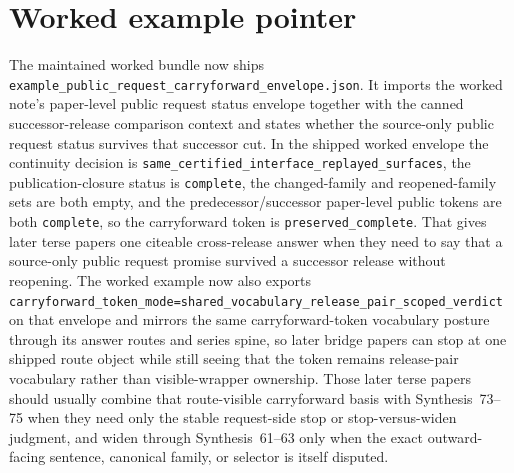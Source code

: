 \documentclass[11pt]{article}
\begin{document}
\section{Worked example pointer}
The maintained worked bundle now ships \nolinkurl{example_public_request_carryforward_envelope.json}.\cite{series:workedexample}
It imports the worked note's paper-level public request status envelope together with the canned successor-release comparison context and states whether the source-only public request status survives that successor cut. In the shipped worked envelope the continuity decision is \texttt{same\_certified\_interface\_replayed\_surfaces}, the publication-closure status is \texttt{complete}, the changed-family and reopened-family sets are both empty, and the predecessor/successor paper-level public tokens are both \texttt{complete}, so the carryforward token is \texttt{preserved\_complete}.
That gives later terse papers one citeable cross-release answer when they need to say that a source-only public request promise survived a successor release without reopening. The worked example now also exports \texttt{carryforward\_token\_mode=shared\_vocabulary\_release\_pair\_scoped\_verdict} on that envelope and mirrors the same carryforward-token vocabulary posture through its answer routes and series spine, so later bridge papers can stop at one shipped route object while still seeing that the token remains release-pair vocabulary rather than visible-wrapper ownership. Those later terse papers should usually combine that route-visible carryforward basis with Synthesis~73--75 when they need only the stable request-side stop or stop-versus-widen judgment, and widen through Synthesis~61--63 only when the exact outward-facing sentence, canonical family, or selector is itself disputed.\cite{series:publicrequestnotices,series:publicrequestnoticenormalforms,series:publicrequestnoticeselections,series:publicrequestresponsepacketrefreshresponsepacketclosureverdicts,series:pairedterminalcitationdiscipline,series:pairedterminalcutoverrule}
\end{document}
